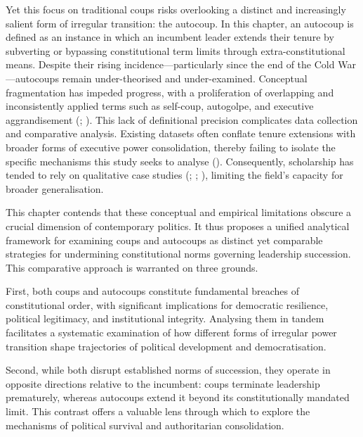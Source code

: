 \documentclass[
  12pt,
]{report}
\begin{document}
Yet this focus on traditional coups risks overlooking a distinct and
increasingly salient form of irregular transition: the autocoup. In this
chapter, an autocoup is defined as an instance in which an incumbent
leader extends their tenure by subverting or bypassing constitutional
term limits through extra-constitutional means. Despite their rising
incidence---particularly since the end of the Cold War---autocoups
remain under-theorised and under-examined. Conceptual fragmentation has
impeded progress, with a proliferation of overlapping and inconsistently
applied terms such as self-coup, autogolpe, and executive aggrandisement
(;
). This lack of
definitional precision complicates data collection and comparative
analysis. Existing datasets often conflate tenure extensions with
broader forms of executive power consolidation, thereby failing to
isolate the specific mechanisms this study seeks to analyse
(). Consequently,
scholarship has tended to rely on qualitative case studies
(;
;
),
limiting the field's capacity for broader generalisation.

This chapter contends that these conceptual and empirical limitations
obscure a crucial dimension of contemporary politics. It thus proposes a
unified analytical framework for examining coups and autocoups as
distinct yet comparable strategies for undermining constitutional norms
governing leadership succession. This comparative approach is warranted
on three grounds.

First, both coups and autocoups constitute fundamental breaches of
constitutional order, with significant implications for democratic
resilience, political legitimacy, and institutional integrity. Analysing
them in tandem facilitates a systematic examination of how different
forms of irregular power transition shape trajectories of political
development and democratisation.

Second, while both disrupt established norms of succession, they operate
in opposite directions relative to the incumbent: coups terminate
leadership prematurely, whereas autocoups extend it beyond its
constitutionally mandated limit. This contrast offers a valuable lens
through which to explore the mechanisms of political survival and
authoritarian consolidation.
\end{document}
